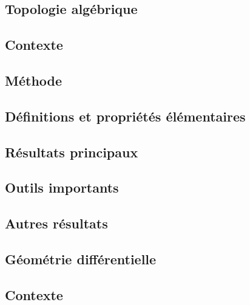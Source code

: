 \documentclass[12pt,a4paper]{article}
\begin{document}
\newpage
\begin{center}  
\section*{Topologie algébrique} 
\end{center}



\subsection*{Contexte}

\subsection*{Méthode}

\subsection*{Définitions et propriétés élémentaires}

\subsection*{Résultats principaux}

\subsection*{Outils importants}


\subsection*{Autres résultats}


\newpage
\begin{center}  
\section*{Géométrie différentielle} 
\end{center}


\subsection*{Contexte}
\end{document}
